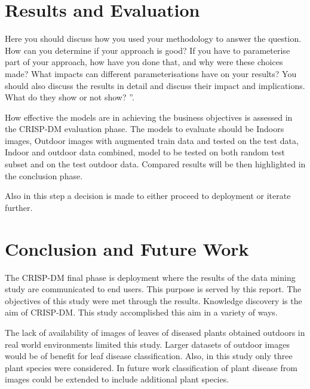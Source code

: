 \documentclass[conference]{IEEEtran}
\begin{document}
\section{Results and Evaluation}
Here you should discuss how you used your methodology to answer the question.  How can you determine if your approach is good?  If you have to parameterise part of your approach, how have you done that, and why were these choices made?  What impacts can different parameterisations have  on  your  results?   You  should  also  discuss  the  results  in  detail  and discuss their impact and implications.  What do they show or not show? ”. \

How effective the models are in achieving the business objectives is assessed in the CRISP-DM evaluation phase. The models to evaluate should be Indoors images, Outdoor images with augmented train data and tested on the test data, Indoor and outdoor data combined, model to be tested on both random test subset and on the test outdoor data. Compared results will be then highlighted in the conclusion phase. \

Also in this step a decision is made to either proceed to deployment or iterate further.  

\section{Conclusion and Future Work}
The CRISP-DM final phase is deployment where the results of the data mining study are communicated to end users. This purpose is served by this report. The objectives of this study were met through the results. Knowledge discovery is the aim of CRISP-DM. This study accomplished this aim in a variety of ways. 

The lack of availability of images of leaves of diseased plants obtained outdoors in real world environments limited this study. Larger datasets of outdoor images would be of benefit for leaf disease classification. Also, in this study only three plant species were considered. In future work classification of plant disease from images could be extended to include additional plant species. 
\end{document}
